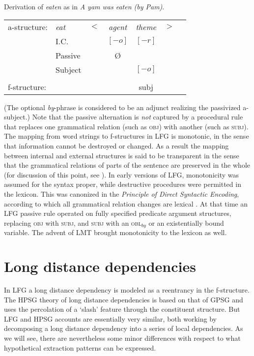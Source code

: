  \begin{exe}
\ex\label{yam2}{Derivation of \textit{eaten} as in \textit{A yam was eaten (by Pam)}.\\
\begin{tabular}[t]{@{}lllccll}
a-structure: &{\it eat}& $<$& \textit{agent} & \textit{theme}   & $>$ & \\
             & I.C.      &    & $[-o]$ & $[-r]$   &   & \\
             & Passive      &    & \O  &    &   & \\
             &  Subject     &    &  &       $[-o]$     &              & \\
             &       &    &    & \vline &    & \\
f-structure: &       &    & &{\sc subj} &   &
\end{tabular}
  }
\end{exe}
(The optional \textit{by}-phrase is considered to be an adjunct realizing the passivized a-subject.)  Note that the passive alternation is \textit{not} captured by a procedural rule that replaces one grammatical relation (such as \textsc{obj}) with another (such as \textsc{subj}).   The mapping from word strings to f-structures in LFG is monotonic, in the sense that information cannot be destroyed or changed.  As a result the mapping between internal and external structures is said to be transparent in the sense that the grammatical relations of parts of the sentence are preserved in the whole (for discussion of this point, see \citealt[Chapter 5]{BATW2016a}).  In early versions of LFG, monotonicity was assumed for the syntax proper, while destructive procedures were permitted in the lexicon.  This was canonized in the \textit{Principle of Direct Syntactic Encoding}, according to which all grammatical relation changes are lexical \citep{Bresnan82a-ed}.  At that time an LFG passive rule operated on fully specified predicate argument structures, replacing \textsc{obj} with \textsc{subj}, and \textsc{subj} with an \textsc{obl$_{by}$} or an existentially bound variable.  The advent of LMT brought monotonicity to the lexicon as well.  


\section{Long distance dependencies}
In LFG a long distance dependency is modeled as a reentrancy in the f-structure.  The HPSG theory of long distance dependencies is based on that of GPSG \citep{Gazdar81a} and uses the percolation of a `slash' feature through the constituent structure.  But LFG and HPSG accounts are essentially very similar, both working by decomposing a long distance dependency into a series of local dependencies.  As we will see, there are nevertheless some minor differences with respect to what hypothetical extraction patterns can be expressed.  

